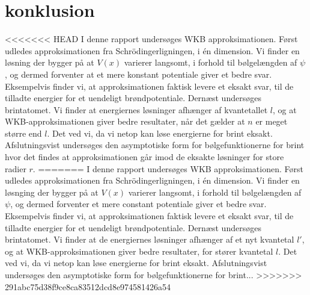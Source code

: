 \section{konklusion}
<<<<<<< HEAD
I denne rapport undersøges WKB approksimationen. Først udledes approksimationen fra Schrödingerligningen, i én dimension. Vi finder en løsning der bygger på at $V(x)$ varierer langsomt, i forhold til bølgelængden af $\psi$, og dermed forventer at et mere konstant potentiale giver et bedre svar. Eksempelvis finder vi, at approksimationen faktisk levere et eksakt svar, til de tilladte energier for et uendeligt brøndpotentiale. Dernæst undersøges brintatomet. Vi finder at energiernes løsninger afhænger af kvantetallet $l$, og at WKB-approksimationen giver bedre resultater, når det gælder at $n$ er meget større end $l$. Det ved vi, da vi netop kan løse energierne for brint eksakt. Afslutningsvist undersøges den asymptotiske form for bølgefunktionerne for brint hvor det findes at approksimationen går imod de eksakte løsninger for store radier $r$.
=======
I denne rapport undersøges WKB approksimationen. Først udledes approksimationen fra Schrödingerligningen, i én dimension. Vi finder en løsnging der bygger på at $V(x)$ varierer langsomt, i forhold til bølgelængden af $\psi$, og dermed forventer et mere constant potentiale giver et bedre svar. Eksempelvis finder vi, at approksimationen faktisk levere et eksakt svar, til de tilladte energier for et uendeligt brøndpotentiale. Dernæst undersøges brintatomet. Vi finder at de energiernes løsninger afhænger af et nyt kvantetal $l'$, og at WKB-approksimationen giver bedre resultater, for stører kvantetal $l$. Det ved vi, da vi netop kan løse energierne for brint eksakt. Afslutningsvist undersøges den asymptotiske form for bølgefunktionerne for brint... %
>>>>>>> 291abc75d38f9ce8ca83512dcd8e974581426a54
